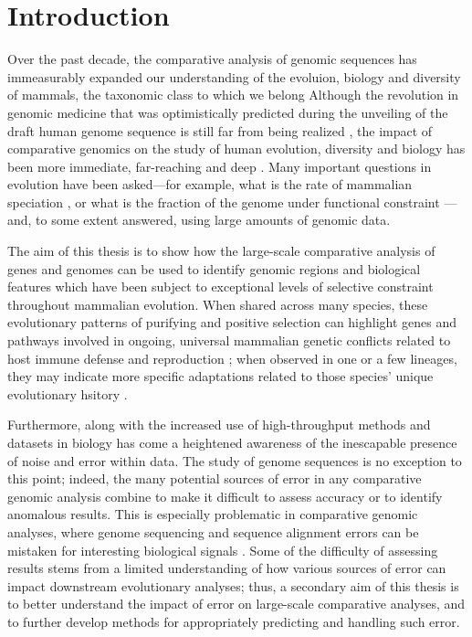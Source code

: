 \chapter{Introduction}
\label{ch_intro}

Over the past decade, the comparative analysis of genomic sequences
has immeasurably expanded our understanding of the evoluion, biology
and diversity of mammals, the taxonomic class to which we belong
Although the revolution in genomic
medicine that was optimistically predicted during the unveiling of the
draft human genome sequence is still far from being realized
\citep{Collins2001,Varmus2010}, the impact of comparative genomics on
the study of human evolution, diversity and biology has been more
immediate, far-reaching and deep \citep{OBrien1999,Lander2011}. Many
important questions in evolution have been asked---for example, what
is the rate of mammalian speciation
\citep{BinindaEmonds2007,Venditti2011}, or what is the fraction of the
genome under functional constraint
\citep{Boffelli2003a,Siepel2005,Ponting2011}---and, to some extent
answered, using large amounts of genomic data.

The aim of this thesis is to show how the large-scale comparative
analysis of genes and genomes can be used to identify genomic regions
and biological features which have been subject to exceptional levels
of selective constraint throughout mammalian evolution. When shared
across many species, these evolutionary patterns of purifying and
positive selection can highlight genes and pathways involved in
ongoing, universal mammalian genetic conflicts related to host immune
defense and reproduction \citep{CastilloDavis2004}; when observed in
one or a few lineages, they may indicate more specific adaptations
related to those species' unique evolutionary hsitory
\citep{Messier1997,Sawyer2005a,Nielsen2007}.

Furthermore, along with the increased use of high-throughput methods
and datasets in biology has come a heightened awareness of the
inescapable presence of noise and error within data. The study of
genome sequences is no exception to this point; indeed, the many
potential sources of error in any comparative genomic analysis combine
to make it difficult to assess accuracy or to identify anomalous
results. This is especially problematic in comparative genomic
analyses, where genome sequencing and sequence alignment errors can be
mistaken for interesting biological signals
\citep{Mallick2009,Schneider2009,Fletcher2010,MarkovaRaina2011}. Some
of the difficulty of assessing results stems from a limited
understanding of how various sources of error can impact downstream
evolutionary analyses; thus, a secondary aim of this thesis is to
better understand the impact of error on large-scale comparative
analyses, and to further develop methods for appropriately predicting
and handling such error.

